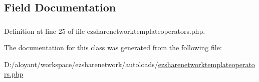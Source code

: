 \subsection{Field Documentation}
\hypertarget{classextension_1_1ezsharenetwork_1_1autoloads_1_1e_z_share_network_template_operators_ad053de9bfb6cccd88ee9d76ab182370f}{
\subsubsection[{\$\-Operators}]{}}\label{classextension_1_1ezsharenetwork_1_1autoloads_1_1e_z_share_network_template_operators_ad053de9bfb6cccd88ee9d76ab182370f}


Definition at line 25 of file ezsharenetworktemplateoperators.\-php.



The documentation for this class was generated from the following file\-:\begin{DoxyCompactItemize}
\item 
D\-:/aloyant/workspace/ezsharenetwork/autoloads/\hyperlink{ezsharenetworktemplateoperators_8php}{ezsharenetworktemplateoperators.\-php}\end{DoxyCompactItemize}
